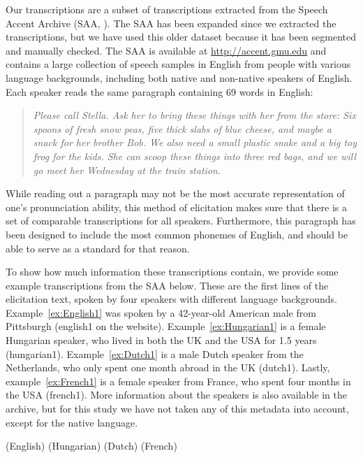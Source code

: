 \documentclass[output=paper]{LSP/langsci}
\begin{document}
Our transcriptions are a subset of transcriptions extracted from the Speech Accent Archive (SAA, \citealt{weinberger_speech_2011}). The SAA has been expanded since we extracted the transcriptions, but we have used this older dataset because it has been segmented and manually checked. The SAA is available at \url{http://accent.gmu.edu} and contains a large collection of speech samples in English from people with various language backgrounds, including both native and non-native speakers of English. Each speaker reads the same paragraph containing 69 words in English:

\begin{quote}
\textit{Please call Stella. Ask her to bring these things with her from the store: Six spoons of fresh snow peas, five thick slabs of blue cheese, and maybe a snack for her brother Bob. We also need a small plastic snake and a big toy frog for the kids. She can scoop these things into three red bags, and we will go meet her Wednesday at the train station.}
\end{quote}

While reading out a paragraph may not be the most accurate representation of one's pronunciation ability, this method of elicitation makes sure that there is a set of comparable transcriptions for all speakers. Furthermore, this paragraph has been designed to include the most common phonemes of English, and should be able to serve as a standard for that reason.

To show how much information these transcriptions contain, we provide some example transcriptions from the SAA below. These are the first lines of the elicitation text, spoken by four speakers with different language backgrounds. Example~\ref{ex:English1} was spoken by a 42-year-old American male from Pittsburgh (english1 on the website). Example~\ref{ex:Hungarian1} is a female Hungarian speaker, who lived in both the UK and the USA for 1.5 years (hungarian1). Example~\ref{ex:Dutch1} is a male Dutch speaker from the Netherlands, who only spent one month abroad in the UK (dutch1). Lastly, example~\ref{ex:French1} is a female speaker from France, who spent four months in the USA (french1). More information about the speakers is also available in the archive, but for this study we have not taken any of this metadata into account, except for the native language.

\begin{exe}
\ex \label{ex:English1} {} (English)
\ex \label{ex:Hungarian1} {} (Hungarian)
\ex \label{ex:Dutch1} {} (Dutch)
\ex \label{ex:French1} {} (French)
\end{exe}
\end{document}
